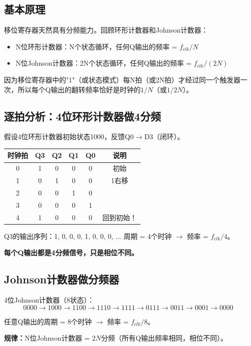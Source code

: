 \subsection{基本原理}

移位寄存器天然具有分频能力。回顾环形计数器和Johnson计数器：

\begin{itemize}
  \item N位环形计数器：N个状态循环，任何Q输出的频率 = $f_{clk} / N$
  \item N位Johnson计数器：2N个状态循环，任何Q输出的频率 = $f_{clk} / (2N)$
\end{itemize}

因为移位寄存器中的"1"（或状态模式）每N拍（或2N拍）才经过同一个触发器一次，所以每个Q输出的翻转频率恰好是时钟的$1/N$（或$1/2N$）。

\subsection{逐拍分析：4位环形计数器做4分频}

假设4位环形计数器初始状态1000，反馈Q0$\to$D3（闭环）。

\begin{center}
\begin{tabular}{|c|c|c|c|c|c|}
\hline
时钟拍 & Q3 & Q2 & Q1 & Q0 & 说明 \\
\hline
0 & 1 & 0 & 0 & 0 & 初始 \\
1 & 0 & 1 & 0 & 0 & 1右移 \\
2 & 0 & 0 & 1 & 0 & \\
3 & 0 & 0 & 0 & 1 & \\
4 & 1 & 0 & 0 & 0 & 回到初始！\\
\hline
\end{tabular}
\end{center}

Q3的输出序列：1, 0, 0, 0, 1, 0, 0, 0, ...
周期 = 4个时钟 $\to$ 频率 = $f_{clk} / 4$。

\textbf{每个Q输出都是4分频信号，只是相位不同。}

\subsection{Johnson计数器做分频器}

4位Johnson计数器（8状态）：
$$0000\to1000\to1100\to1110\to1111\to0111\to0011\to0001\to0000$$

任意Q输出的周期 = 8个时钟 $\to$ 频率 = $f_{clk} / 8$。

\textbf{规律：}N位Johnson计数器 = $2N$分频（所有Q输出频率相同，相位不同）。

